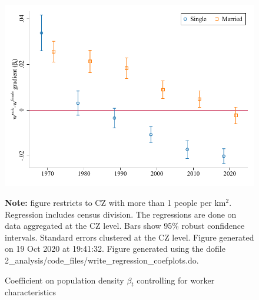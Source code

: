 \begin{figure}[!h]
\centering
\caption{Coefficient on population density $ \beta_t $ controlling for worker characteristics}
\includegraphics[width=.6\textwidth]{../2_analysis/output/figures/by_married_czone_l_czone_density_full_time}
\par \begin{minipage}[h]{\textwidth}{\tiny\textbf{Note:} figure restricts to CZ with more than 1 people per km$^2$. Regression includes census division. The regressions are done on data aggregated at the CZ level. Bars show 95\% robust confidence intervals. Standard errors clustered at the CZ level. Figure generated on 19 Oct 2020 at 19:41:32. Figure generated using the dofile 2\_analysis/code\_files/write\_regression\_coefplots.do.}\end{minipage}
\end{figure}

